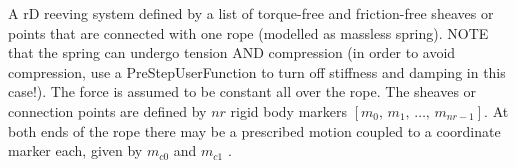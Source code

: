 \ei

%
\newpage


\label{sec:item:ObjectConnectorReevingSystemSprings}
A rD reeving system defined by a list of torque-free and friction-free sheaves or points that are connected with one rope (modelled as massless spring). NOTE that the spring can undergo tension AND compression (in order to avoid compression, use a PreStepUserFunction to turn off stiffness and damping in this case!). The force is assumed to be constant all over the rope. The sheaves or connection points are defined by $nr$ rigid body markers $[m_0, \, m_1, \, \ldots, \, m_{nr-1}]$. At both ends of the rope there may be a prescribed motion coupled to a coordinate marker each, given by $m_{c0}$ and $m_{c1}$ .
\vspace{12pt}\\

